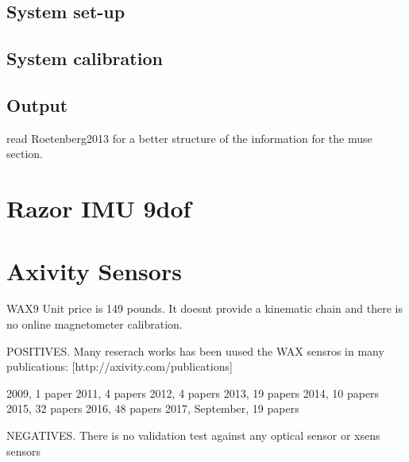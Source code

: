 \subsection{System set-up}
\subsection{System calibration}
\subsection{Output}

read Roetenberg2013 for a better structure of the information for the muse section.




\section{Razor IMU 9dof}

\section{Axivity Sensors}


WAX9 Unit price is 149 pounds.
It doesnt provide a kinematic chain and there is no online magnetometer calibration.

POSITIVES.
Many reserach works has been uused the WAX sensros in many publications:
[http://axivity.com/publications]

2009, 1 paper
2011, 4 papers
2012, 4 papers
2013, 19 papers
2014, 10 papers
2015, 32 papers
2016, 48 papers
2017, September, 19 papers



NEGATIVES. There is no validation test against any optical sensor or xsens sensors







